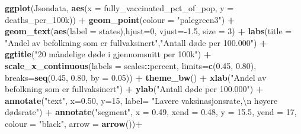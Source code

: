 \documentclass[
]{article}
\newenvironment{Shaded}{\begin{snugshade}}{\end{snugshade}}
\newcommand{\CharTok}[1]{\textcolor[rgb]{0.31,0.60,0.02}{#1}}
\newcommand{\DataTypeTok}[1]{\textcolor[rgb]{0.13,0.29,0.53}{#1}}
\newcommand{\DecValTok}[1]{\textcolor[rgb]{0.00,0.00,0.81}{#1}}
\newcommand{\FloatTok}[1]{\textcolor[rgb]{0.00,0.00,0.81}{#1}}
\newcommand{\KeywordTok}[1]{\textcolor[rgb]{0.13,0.29,0.53}{\textbf{#1}}}
\newcommand{\NormalTok}[1]{#1}
\newcommand{\OperatorTok}[1]{\textcolor[rgb]{0.81,0.36,0.00}{\textbf{#1}}}
\newcommand{\StringTok}[1]{\textcolor[rgb]{0.31,0.60,0.02}{#1}}
\begin{document}
\begin{Shaded}
\begin{Highlighting}[]
\KeywordTok{ggplot}\NormalTok{(Jsondata, }\KeywordTok{aes}\NormalTok{(}\DataTypeTok{x =}\NormalTok{ fully_vaccinated_pct_of_pop, }\DataTypeTok{y =}\NormalTok{ deaths_per_100k)) }\OperatorTok{+}\StringTok{ }
\StringTok{  }\KeywordTok{geom_point}\NormalTok{(}\DataTypeTok{colour =} \StringTok{"palegreen3"}\NormalTok{) }\OperatorTok{+}\StringTok{ }
\StringTok{  }\KeywordTok{geom_text}\NormalTok{(}\KeywordTok{aes}\NormalTok{(}\DataTypeTok{label =}\NormalTok{ states),}\DataTypeTok{hjust=}\DecValTok{0}\NormalTok{, }\DataTypeTok{vjust=}\OperatorTok{-}\FloatTok{1.5}\NormalTok{, }\DataTypeTok{size =} \DecValTok{3}\NormalTok{) }\OperatorTok{+}
\StringTok{  }\KeywordTok{labs}\NormalTok{(}\DataTypeTok{title =} \StringTok{"Andel av befolkning som er fullvaksinert"}\NormalTok{,}\StringTok{"Antall døde per 100.000"}\NormalTok{) }\OperatorTok{+}
\StringTok{  }\KeywordTok{ggtitle}\NormalTok{(}\StringTok{"20 måndelige døde i gjennomsnitt per 100k"}\NormalTok{) }\OperatorTok{+}\StringTok{ }
\StringTok{  }\KeywordTok{scale_x_continuous}\NormalTok{(}\DataTypeTok{labels =}\NormalTok{ scales}\OperatorTok{::}\NormalTok{percent, }\DataTypeTok{limits=}\KeywordTok{c}\NormalTok{(}\FloatTok{0.45}\NormalTok{, }\FloatTok{0.80}\NormalTok{), }\DataTypeTok{breaks=}\KeywordTok{seq}\NormalTok{(}\FloatTok{0.45}\NormalTok{, }\FloatTok{0.80}\NormalTok{, }\DataTypeTok{by =} \FloatTok{0.05}\NormalTok{)) }\OperatorTok{+}\StringTok{ }
\StringTok{  }\KeywordTok{theme_bw}\NormalTok{() }\OperatorTok{+}\StringTok{ }
\StringTok{  }\KeywordTok{xlab}\NormalTok{(}\StringTok{"Andel av befolkning som er fullvaksinert"}\NormalTok{) }\OperatorTok{+}\StringTok{ }
\StringTok{  }\KeywordTok{ylab}\NormalTok{(}\StringTok{"Antall døde per 100.000"}\NormalTok{) }\OperatorTok{+}
\StringTok{  }\KeywordTok{annotate}\NormalTok{(}\StringTok{"text"}\NormalTok{, }\DataTypeTok{x=}\FloatTok{0.50}\NormalTok{, }\DataTypeTok{y=}\DecValTok{15}\NormalTok{, }
           \DataTypeTok{label=} \StringTok{"Lavere vaksinasjonsrate,}\CharTok{\textbackslash{}n}\StringTok{ høyere dødsrate"}\NormalTok{) }\OperatorTok{+}
\StringTok{  }\KeywordTok{annotate}\NormalTok{(}\StringTok{"segment"}\NormalTok{, }\DataTypeTok{x =} \FloatTok{0.49}\NormalTok{, }
           \DataTypeTok{xend =} \FloatTok{0.48}\NormalTok{, }\DataTypeTok{y =} \FloatTok{15.5}\NormalTok{, }
           \DataTypeTok{yend =} \DecValTok{17}\NormalTok{, }\DataTypeTok{colour =} \StringTok{"black"}\NormalTok{, }\DataTypeTok{arrow =} \KeywordTok{arrow}\NormalTok{())}\OperatorTok{+}

\end{Highlighting}
\end{Shaded}
\end{document}

